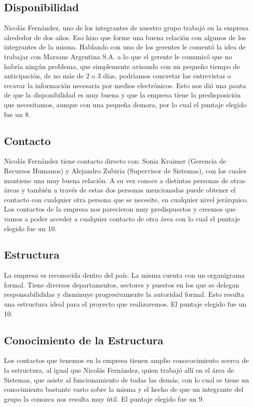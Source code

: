 \documentclass[12pt,a4paper,spanish]{article}
\begin{document}
\subsection{Disponibilidad}
Nicol\'{a}s Fern\'andez, uno de los integrantes de nuestro grupo trabaj\'{o} en la empresa alrededor de dos a\~nos. Eso hizo que forme una buena relaci\'{o}n con algunos de los integrantes de la misma. Hablando con uno de los gerentes le coment\'{o} la idea de trabajar con Marsans Argentina S.A. a lo que el gerente le comunic\'{o} que no habr\'{i}a ning\'{u}n problema, que simplemente avisando con un peque\~no tiempo de anticipaci\'on, de no m\'{a}s de 2 o 3 d\'{i}as, podr\'{i}amos concretar las entrevistas o recavar la informaci\'on necesaria por medios electr\'onicos. Esto nos di\'{o} una pauta de que la disponibilidad es muy buena y que la empresa tiene la predisposici\'{o}n que necesitamos, aunque con una peque\~na demora, por lo cual el puntaje elegido fue un 8.

\subsection{Contacto}
Nicol\'{a}s Fern\'andez tiene contacto directo con: Sonia Kraimer (Gerencia de Recursos Humanos) y Alejandro Zubiria (Supervisor de Sistemas), con los cuales mantiene una muy buena relaci\'{o}n. A su vez conoce a distintas personas de otras \'{a}reas y tambi\'{e}n a trav\'{e}s de estas dos personas mencionadas puede obtener el contacto con cualquier otra persona que se necesite, en cualquier nivel jer\'arquico. Los contactos de la empresa nos parecieron muy predispuestos y creemos que vamos a poder acceder a cualquier contacto de otra \'{a}rea con lo cual el puntaje elegido fue un 10.

\subsection{Estructura}
La empresa es reconocida dentro del pa\'{i}s. La misma cuenta con un organigrama formal. Tiene diversos departamentos, sectores y puestos en los que se delegan responsabilididas y disminuye progresivamente la autoridad formal. Esto resulta una estructura ideal para el proyecto que realizaremos. El puntaje elegido fue un 10.

\subsection{Conocimiento de la Estructura}
Los contactos que tenemos en la empresa tienen amplio conococimiento acerca de la estructura, al igual que Nicol\'{a}s Fern\'andez, quien trabaj\'{o} all\'{i} en el \'area de Sistemas, que asiste al funcionamiento de todas las dem\'as, con lo cual se tiene un conocimiento bastante vasto sobre la misma y el hecho de que un integrante del grupo la conozca nos resulta muy \'{u}til. El puntaje elegido fue un 9.
\end{document}
